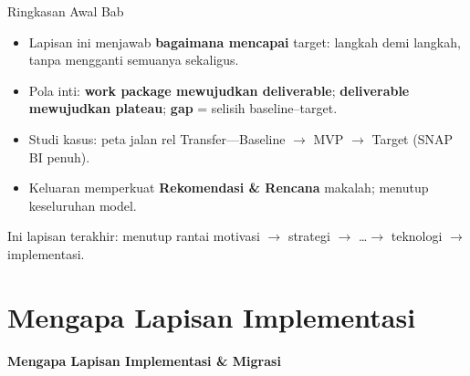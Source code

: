 \documentclass[aspectratio=169, table]{beamer}
\newcommand{\sectionframe}[1]{%
  \begin{frame}{\hfill}
    \centering
    \Huge{\textbf{#1}}
  \end{frame}
}
\newcommand{\takeaway}[1]{%
  \vspace{4pt}
  {\footnotesize #1}
}
\begin{document}
\begin{frame}{Ringkasan Awal Bab}
  \vspace{6pt}
  \begin{itemize}
    \item Lapisan ini menjawab \textbf{bagaimana mencapai} target: langkah demi
          langkah, tanpa mengganti semuanya sekaligus.
    \item Pola inti: \textbf{work package mewujudkan deliverable}; \textbf{deliverable
          mewujudkan plateau}; \textbf{gap} = selisih baseline--target.
    \item Studi kasus: peta jalan rel Transfer---Baseline $\rightarrow$ MVP
          $\rightarrow$ Target (SNAP BI penuh).
    \item Keluaran memperkuat \textbf{Rekomendasi \& Rencana} makalah; menutup
          keseluruhan model.
  \end{itemize}
  \takeaway{Ini lapisan terakhir: menutup rantai motivasi $\rightarrow$ strategi
  $\rightarrow$ \dots $\rightarrow$ teknologi $\rightarrow$ implementasi.}
\end{frame}

\section{Mengapa Lapisan Implementasi}
\sectionframe{Mengapa Lapisan Implementasi \& Migrasi}
\end{document}
